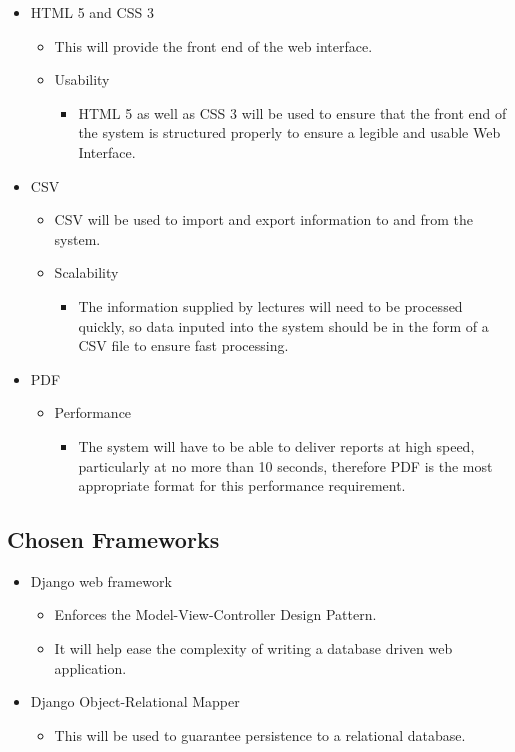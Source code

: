 \documentclass[12pt,a4paper]{article}
\begin{document}
\begin{itemize}
\begin{itemize}
		\end{itemize}
	\item HTML 5 and CSS 3
		\begin{itemize}
			\item This will provide the front end of the web interface.
			\item Usability
				\begin{itemize}
					\item HTML 5 as well as CSS 3 will be used to ensure that the front end of the system is structured properly to ensure a legible and usable Web Interface.
				\end{itemize}
		\end{itemize}
	\item CSV	
		\begin{itemize}
			\item CSV will be used to import and export information to and from the system.
			\item Scalability
				\begin{itemize}
					\item The information supplied by lectures will need to be processed quickly, so data inputed into the system should be in the form of a CSV file to ensure fast processing.
				\end{itemize}
		\end{itemize}
	\item PDF
		\begin{itemize}
			\item Performance
				\begin{itemize}
					\item The system will have to be able to deliver reports at high speed, particularly at no more than 10 seconds, therefore PDF is the most appropriate format for this performance requirement.
				\end{itemize}
		\end{itemize}
\end{itemize}

\subsection{Chosen Frameworks}
\begin{itemize}
	\item Django web framework
		\begin{itemize}
			\item Enforces the Model-View-Controller Design Pattern. 
			\item It will help ease the complexity of writing a database driven web application.
		\end{itemize}
	\item Django Object-Relational Mapper
		\begin{itemize}
			\item This will be used to guarantee persistence to a relational database.
		\end{itemize}
\end{itemize}
\end{document}
